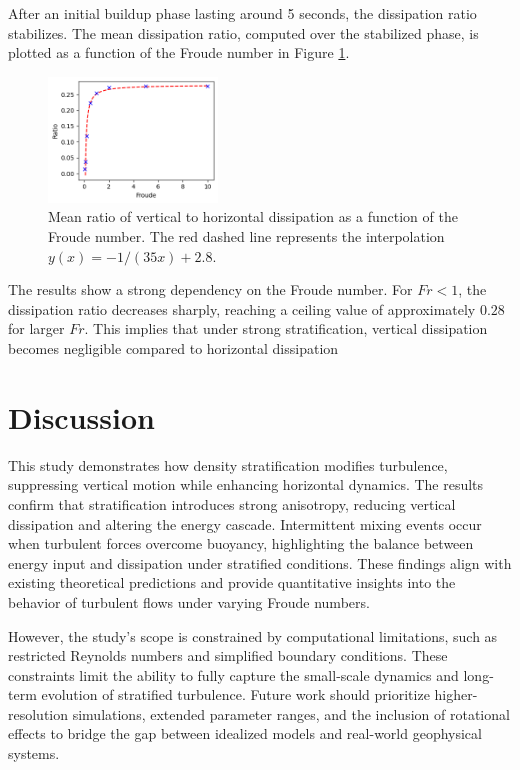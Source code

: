 \documentclass[final,5p,times,twocolumn,authoryear]{elsarticle}
\begin{document}
After an initial buildup phase lasting around 5 seconds, the dissipation ratio stabilizes. The mean dissipation ratio, computed over the stabilized phase, is plotted as a function of the Froude number in Figure \ref{fig:kzkh Froude}.
\begin{figure}[h]
	\centering
	\includegraphics[width=0.4\textwidth]{fig/kzkhFr.png}
	\caption{Mean ratio of vertical to horizontal dissipation as a function of the Froude number. The red dashed line represents the interpolation $y(x) = -1/(35x) + 2.8$.} 
	\label{fig:kzkh Froude}
\end{figure}

The results show a strong dependency on the Froude number. For $Fr < 1$, the dissipation ratio decreases sharply, reaching a ceiling value of approximately $0.28$ for larger $Fr$. This implies that under strong stratification, vertical dissipation becomes negligible compared to horizontal dissipation

\section{Discussion}

This study demonstrates how density stratification modifies turbulence, suppressing vertical motion while enhancing horizontal dynamics. The results confirm that stratification introduces strong anisotropy, reducing vertical dissipation and altering the energy cascade. Intermittent mixing events occur when turbulent forces overcome buoyancy, highlighting the balance between energy input and dissipation under stratified conditions. These findings align with existing theoretical predictions and provide quantitative insights into the behavior of turbulent flows under varying Froude numbers.

However, the study’s scope is constrained by computational limitations, such as restricted Reynolds numbers and simplified boundary conditions. These constraints limit the ability to fully capture the small-scale dynamics and long-term evolution of stratified turbulence. Future work should prioritize higher-resolution simulations, extended parameter ranges, and the inclusion of rotational effects to bridge the gap between idealized models and real-world geophysical systems.
\end{document}
